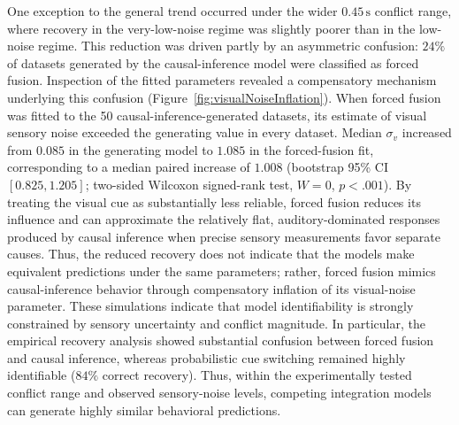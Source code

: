\documentclass{jov}
\begin{document}
One exception to the general trend occurred under the wider \(0.45\,\mathrm{s}\) conflict range, where recovery in the very-low-noise regime was slightly poorer than in the low-noise regime. This reduction was driven partly by an asymmetric confusion: \(24\%\) of datasets generated by the causal-inference model were classified as forced fusion. Inspection of the fitted parameters revealed a compensatory mechanism underlying this confusion (Figure~\ref{fig:visualNoiseInflation}). When forced fusion was fitted to the 50 causal-inference-generated datasets, its estimate of visual sensory noise exceeded the generating value in every dataset. Median \(\sigma_v\) increased from \(0.085\) in the generating model to \(1.085\) in the forced-fusion fit, corresponding to a median paired increase of \(1.008\) (bootstrap 95\% CI \([0.825,1.205]\); two-sided Wilcoxon signed-rank test, \(W=0\), \(p<.001\)). By treating the visual cue as substantially less reliable, forced fusion reduces its influence and can approximate the relatively flat, auditory-dominated responses produced by causal inference when precise sensory measurements favor separate causes. Thus, the reduced recovery does not indicate that the models make equivalent predictions under the same parameters; rather, forced fusion mimics causal-inference behavior through compensatory inflation of its visual-noise parameter.
These simulations indicate that model identifiability is strongly constrained by sensory uncertainty and conflict magnitude. In particular, the empirical recovery analysis showed substantial confusion between forced fusion and causal inference, whereas probabilistic cue switching remained highly identifiable ($84\%$ correct recovery). Thus, within the experimentally tested conflict range and observed sensory-noise levels, competing integration models can generate highly similar behavioral predictions.

\end{document}

